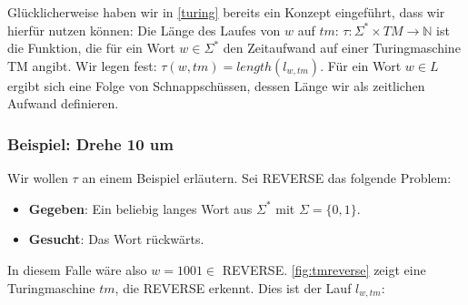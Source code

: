 Glücklicherweise haben wir in \autoref{turing} bereits ein Konzept eingeführt,
dass wir hierfür nutzen können:
Die Länge des Laufes von $w$ auf $tm$:
$\tau: \Sigma^* \times TM \rightarrow \mathbb{N}$ ist die Funktion,
die für ein Wort $w \in \Sigma^*$ den Zeitaufwand auf einer Turingmaschine TM angibt.
Wir legen fest: $\tau(w,tm) =  length(l_{w,tm})$.
Für ein Wort $w \in L$ ergibt sich eine Folge von Schnappschüssen,
dessen Länge wir als zeitlichen Aufwand definieren.


\subsubsection{Beispiel: Drehe 10 um}

Wir wollen $\tau$ an einem Beispiel erläutern.
Sei REVERSE das folgende Problem:
\begin{itemize}
    \item \textbf{Gegeben}: Ein beliebig langes Wort aus $\Sigma^*$ mit $\Sigma = \{0,1\}$.
    \item \textbf{Gesucht}: Das Wort rückwärts.
\end{itemize}

In diesem Falle wäre also $w = 1001 \in$ REVERSE.
\autoref{fig:tmreverse} zeigt eine Turingmaschine $tm$, die REVERSE erkennt.
Dies ist der Lauf $l_{w, tm}$:


